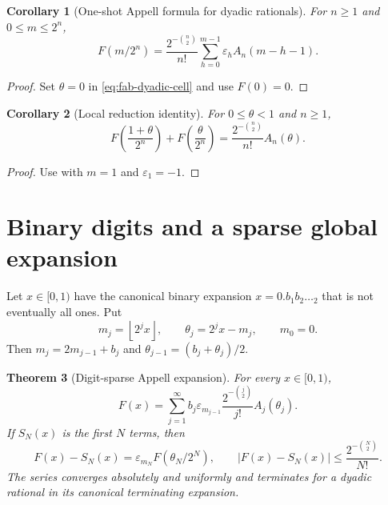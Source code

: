 \documentclass[11pt,oneside,openany]{book}
\newtheorem{theorem}{Theorem}[chapter]
\newtheorem{corollary}[theorem]{Corollary}
\theoremstyle{definition}
\theoremstyle{remark}
\newcommand{\abs}[1]{\lvert #1\rvert}
\newcommand{\floor}[1]{\left\lfloor #1\right\rfloor}
\begin{document}
\begin{corollary}[One-shot Appell formula for dyadic rationals]
\label{cor:fab-dyadic-Appell}
For $n\ge1$ and $0\le m\le2^n$,
\begin{equation}
 \boxed{
 F(m/2^n)=\frac{2^{-\binom n2}}{n!}
 \sum_{h=0}^{m-1}\varepsilon_hA_n(m-h-1).}
 \label{eq:fab-dyadic-Appell}
\end{equation}
\end{corollary}

\begin{proof}
Set $\theta=0$ in \eqref{eq:fab-dyadic-cell} and use $F(0)=0$.
\end{proof}

\begin{corollary}[Local reduction identity]
\label{cor:fab-local-reduction}
For $0\le\theta<1$ and $n\ge1$,
\begin{equation}
 F\!\left(\frac{1+\theta}{2^n}\right)
 +F\!\left(\frac{\theta}{2^n}\right)
 =\frac{2^{-\binom n2}}{n!}A_n(\theta).
 \label{eq:fab-local-reduction}
\end{equation}
\end{corollary}

\begin{proof}
Use  with $m=1$ and $\varepsilon_1=-1$.
\end{proof}

\section{Binary digits and a sparse global expansion}

Let $x\in[0,1)$ have the canonical binary expansion
$x=0.b_1b_2\ldots{}_2$ that is not eventually all ones.  Put
\begin{equation}
 m_j=\floor{2^jx},
 \qquad \theta_j=2^jx-m_j,
 \qquad m_0=0.
 \label{eq:fab-prefix-tail}
\end{equation}
Then $m_j=2m_{j-1}+b_j$ and
$\theta_{j-1}=(b_j+\theta_j)/2$.

\begin{theorem}[Digit-sparse Appell expansion]
\label{thm:fab-digit-Appell}
For every $x\in[0,1)$,
\begin{equation}
 \boxed{
 F(x)=\sum_{j=1}^{\infty}
 b_j\varepsilon_{m_{j-1}}
 \frac{2^{-\binom j2}}{j!}A_j(\theta_j).}
 \label{eq:fab-digit-Appell}
\end{equation}
If $S_N(x)$ is the first $N$ terms, then
\begin{equation}
 F(x)-S_N(x)=\varepsilon_{m_N}F(\theta_N/2^N),
 \qquad
 \abs{F(x)-S_N(x)}\le\frac{2^{-\binom N2}}{N!}.
 \label{eq:fab-digit-residual}
\end{equation}
The series converges absolutely and uniformly and terminates for a dyadic
rational in its canonical terminating expansion.
\end{theorem}
\end{document}
